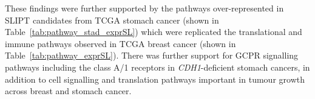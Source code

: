 
These findings were further supported by the \glspl{pathway} over-represented in \gls{SLIPT} candidates from \gls{TCGA} stomach cancer (shown in Table~\ref{tab:pathway_stad_exprSL}) which were replicated the translational and immune \glspl{pathway} observed in \gls{TCGA} breast cancer (shown in Table~\ref{tab:pathway_exprSL}). There was further support for GCPR signalling \glspl{pathway} including the class A/1 receptors in \textit{CDH1}-deficient stomach cancers, in addition to cell signalling and translation \glspl{pathway} important in tumour growth across breast and stomach cancer. %

